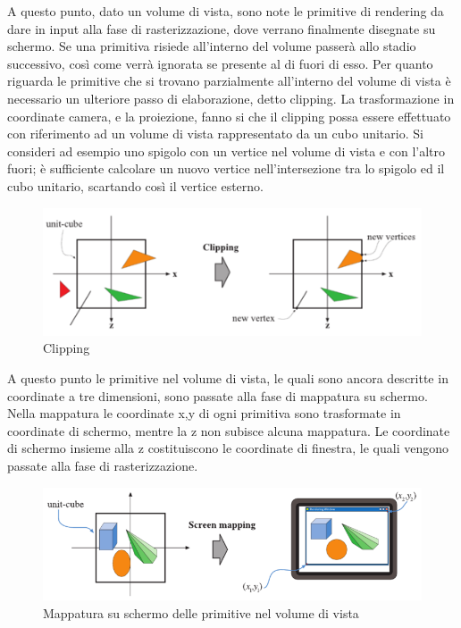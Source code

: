 A questo punto, dato un volume di vista, sono note le primitive di rendering da dare in input alla fase di rasterizzazione, dove verrano finalmente disegnate su schermo.
Se una primitiva risiede all’interno del volume passerà allo stadio successivo, così come verrà ignorata se presente al di fuori di esso. 
Per quanto riguarda le primitive che si trovano parzialmente all’interno del volume di vista è necessario un ulteriore passo di elaborazione, detto clipping. 
La trasformazione in coordinate camera, e la proiezione, fanno si che il clipping possa essere effettuato con riferimento ad un volume di vista rappresentato da un cubo unitario.
Si consideri ad esempio uno spigolo con un vertice nel volume di vista e con l’altro fuori; è sufficiente calcolare un nuovo vertice nell’intersezione tra lo spigolo ed il cubo unitario, scartando così il vertice esterno.
\\
\begin{figure}[htb]
 \centering
 \includegraphics[width=1.0\linewidth]{images/chapter_stato_arte/stato_arte_clipping.png}\hfill
 \caption[Clipping]{Clipping}
 \label{fig:stato_arte_clipping}
\end{figure}

A questo punto le primitive nel volume di vista, le quali sono ancora descritte in coordinate a tre dimensioni, sono passate alla fase di mappatura su schermo. 
Nella mappatura le coordinate x,y di ogni primitiva sono trasformate in coordinate di schermo, mentre la z non subisce alcuna mappatura.
Le coordinate di schermo insieme alla z costituiscono le coordinate di finestra, le quali vengono passate alla fase di rasterizzazione.
\\
\begin{figure}[htb]
 \centering
 \includegraphics[width=1.0\linewidth]{images/chapter_stato_arte/stato_arte_mapping.png}\hfill
 \caption[Mappatura su schermo]{Mappatura su schermo delle primitive nel volume di vista}
 \label{fig:stato_arte_mapping}
\end{figure}

